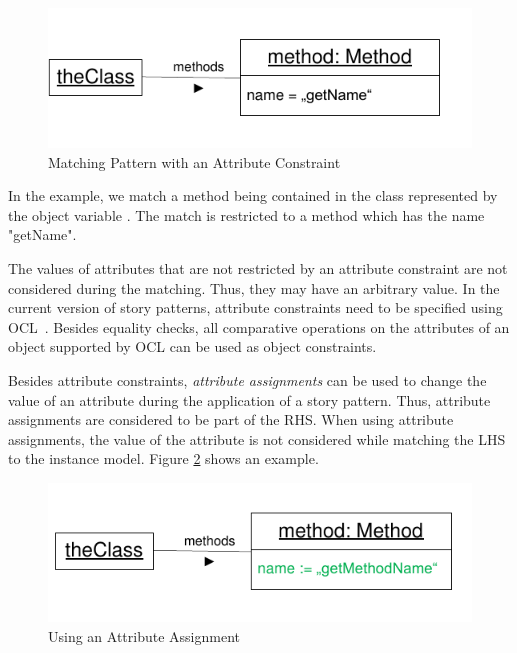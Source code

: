 \begin{figure}[htbp]
  \centering
  \includegraphics[scale=1]{figures/ObjectConstraint}
  \caption{Matching Pattern with an Attribute Constraint}
  \label{fig:objectConstraint}
\end{figure}

In the example, we match a method being contained in the class represented by the object variable . 
The match is restricted to a method which has the name "getName".

The values of attributes that are not restricted by an attribute constraint are not considered during the matching. 
Thus, they may have an arbitrary value. 
In the current version of story patterns, attribute constraints need to be specified using OCL~\cite{OCL}. 
Besides equality checks, all comparative operations on the attributes of an object supported by OCL can be used as object constraints. 

Besides attribute constraints, \emph{attribute assignments} can be used to change the value of an attribute during the application of a story pattern. 
Thus, attribute assignments are considered to be part of the RHS. 
When using attribute assignments, the value of the attribute is not considered while matching the LHS to the instance model. 
Figure \ref{fig:attributeAssignment} shows an example.

\begin{figure}[htbp]
  \centering
  \includegraphics[scale=1]{figures/AttributeAssignment}
  \caption{Using an Attribute Assignment}
  \label{fig:attributeAssignment}
\end{figure}

